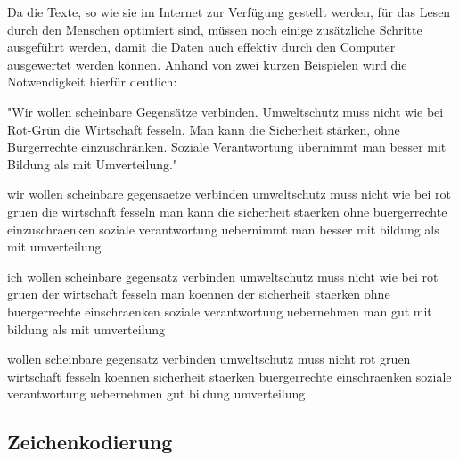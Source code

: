 Da die Texte, so wie sie im Internet zur Verfügung gestellt werden, für das Lesen durch den Menschen optimiert sind, müssen noch einige zusätzliche Schritte ausgeführt werden, damit die Daten auch effektiv durch den Computer ausgewertet werden können. Anhand von zwei kurzen Beispielen wird die Notwendigkeit hierfür deutlich:

\colorbox{rahmen}{"Wir} wollen scheinbare \colorbox{rahmen}{Gegensätze} verbinden\colorbox{rahmen}{. Umweltschutz} muss nicht wie bei \colorbox{rahmen}{Rot-Grün} die \colorbox{rahmen}{Wirtschaft} fesseln\colorbox{rahmen}{. Man} kann die \colorbox{rahmen}{Sicherheit stärken}, ohne \colorbox{rahmen}{Bürgerrechte einzuschränken. Soziale Verantwortung übernimmt} man besser mit \colorbox{rahmen}{Bildung} als mit \colorbox{rahmen}{Umverteilung.}"

\colorbox{rahmen}{wir} wollen scheinbare \colorbox{rahmen}{gegensaetze} verbinden umweltschutz muss nicht wie bei rot gruen \colorbox{rahmen}{die} wirtschaft fesseln man \colorbox{rahmen}{kann die} sicherheit staerken ohne buergerrechte einzuschraenken soziale verantwortung \colorbox{rahmen}{uebernimmt} man \colorbox{rahmen}{besser} mit bildung als mit umverteilung

\colorbox{rahmen}{ich} wollen scheinbare gegensatz verbinden umweltschutz muss nicht \colorbox{rahmen}{wie} bei rot gruen \colorbox{rahmen}{der} wirtschaft fesseln \colorbox{rahmen}{man} koennen \colorbox{rahmen}{der} sicherheit staerken \colorbox{rahmen}{ohne} buergerrechte einschraenken soziale verantwortung uebernehmen \colorbox{rahmen}{man} gut \colorbox{rahmen}{mit} bildung \colorbox{rahmen}{als mit} umverteilung

wollen scheinbare gegensatz verbinden umweltschutz muss nicht rot gruen wirtschaft fesseln koennen sicherheit staerken buergerrechte einschraenken soziale verantwortung uebernehmen gut bildung umverteilung

\subsection{Zeichenkodierung}
